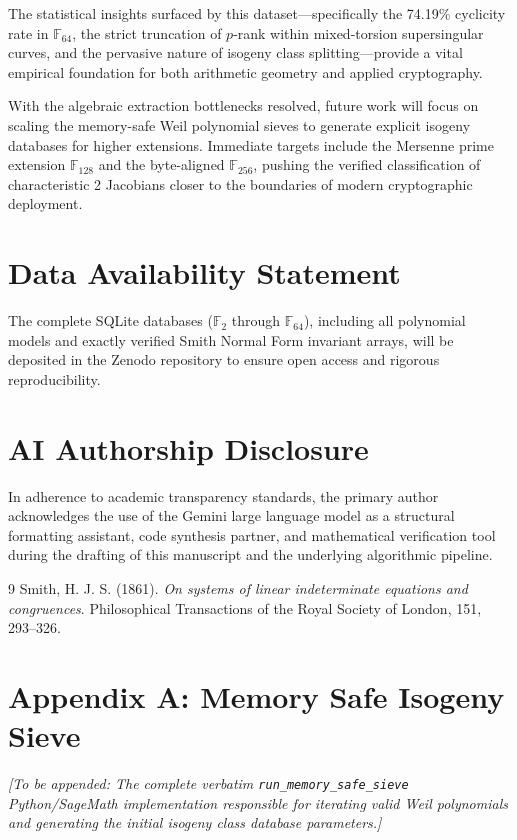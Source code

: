 \documentclass[letterpaper, 11pt]{article}
\begin{document}
The statistical insights surfaced by this dataset---specifically the 74.19\% cyclicity rate in $\mathbb{F}_{64}$, the strict truncation of $p$-rank within mixed-torsion supersingular curves, and the pervasive nature of isogeny class splitting---provide a vital empirical foundation for both arithmetic geometry and applied cryptography. 

With the algebraic extraction bottlenecks resolved, future work will focus on scaling the memory-safe Weil polynomial sieves to generate explicit isogeny databases for higher extensions. Immediate targets include the Mersenne prime extension $\mathbb{F}_{128}$ and the byte-aligned $\mathbb{F}_{256}$, pushing the verified classification of characteristic 2 Jacobians closer to the boundaries of modern cryptographic deployment.

\section{Data Availability Statement}
The complete SQLite databases ($\mathbb{F}_{2}$ through $\mathbb{F}_{64}$), including all polynomial models and exactly verified Smith Normal Form invariant arrays, will be deposited in the Zenodo repository to ensure open access and rigorous reproducibility.

\section{AI Authorship Disclosure}
In adherence to academic transparency standards, the primary author acknowledges the use of the Gemini large language model as a structural formatting assistant, code synthesis partner, and mathematical verification tool during the drafting of this manuscript and the underlying algorithmic pipeline.

\begin{thebibliography}{9}
Smith, H. J. S. (1861). 
\textit{On systems of linear indeterminate equations and congruences}. 
Philosophical Transactions of the Royal Society of London, 151, 293--326.
\end{thebibliography}

\appendix

\section{Appendix A: Memory Safe Isogeny Sieve}
\textit{[To be appended: The complete verbatim \texttt{run\_memory\_safe\_sieve} Python/SageMath implementation responsible for iterating valid Weil polynomials and generating the initial isogeny class database parameters.]}
\end{document}
